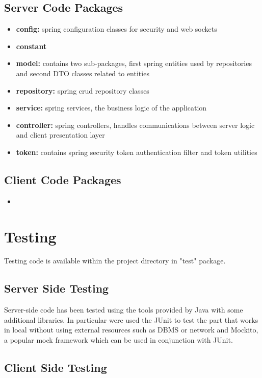 \documentclass[a4paper]{article}
\begin{document}
\subsection{Server Code Packages}
\begin{itemize}
\item \textbf{config:} spring configuration classes for security and web sockets
\item \textbf{constant}
\item \textbf{model:} contains two sub-packages, first spring entities used by repositories and second DTO classes related to entities
\item \textbf{repository:} spring crud repository classes
\item \textbf{service:} spring services, the business logic of the application
\item \textbf{controller:} spring controllers, handles communications between server logic and client presentation layer
\item \textbf{token:} contains spring security token authentication filter and token utilities
\end{itemize}

\subsection{Client Code Packages}
\begin{itemize}
\item[]
\end{itemize}

\newpage
\section{Testing}
Testing code is available within the project directory in "test" package.

\subsection{Server Side Testing}
Server-side code has been tested using the tools provided by Java with some additional libraries. In particular were used the JUnit to test the part that works in local without using external resources such as DBMS or network and Mockito, a popular mock framework which can be used in conjunction with JUnit.

\subsection{Client Side Testing}
\end{document}
